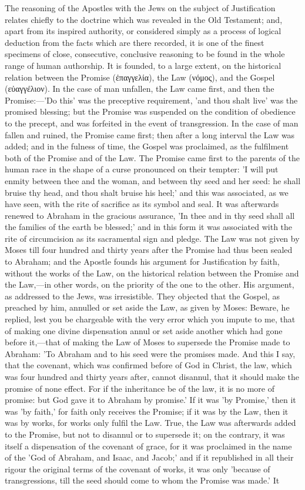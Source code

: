 \documentclass[
]{book}
\begin{document}
The reasoning of the Apostles with the Jews on the subject of Justification relates chiefly to the doctrine which was revealed in the Old Testament; and, apart from its inspired authority, or considered simply as a process of logical deduction from the facts which are there recorded, it is one of the finest specimens of close, consecutive, conclusive reasoning to be found in the whole range of human authorship. It is founded, to a large extent, on the historical relation between the Promise (ἐπαγγελία), the Law (νόμος), and the Gospel (εὐαγγέλιον). In the case of man unfallen, the Law came first, and then the Promise:---'Do this' was the preceptive requirement, 'and thou shalt live' was the promised blessing; but the Promise was suspended on the condition of obedience to the precept, and was forfeited in the event of transgression. In the case of man fallen and ruined, the Promise came first; then after a long interval the Law was added; and in the fulness of time, the Gospel was proclaimed, as the fulfilment both of the Promise and of the Law. The Promise came first to the parents of the human race in the shape of a curse pronounced on their tempter: 'I will put enmity between thee and the woman, and between thy seed and her seed: he shall bruise thy head, and thou shalt bruise his heel;' and this was associated, as we have seen, with the rite of sacrifice as its symbol and seal. It was afterwards renewed to Abraham in the gracious assurance, 'In thee and in thy seed shall all the families of the earth be blessed;' and in this form it was associated with the rite of circumcision as its sacramental sign and pledge. The Law was not given by Moses till four hundred and thirty years after the Promise had thus been sealed to Abraham; and the Apostle founds his argument for Justification by faith, without the works of the Law, on the historical relation between the Promise and the Law,---in other words, on the priority of the one to the other. His argument, as addressed to the Jews, was irresistible. They objected that the Gospel, as preached by him, annulled or set aside the Law, as given by Moses: Beware, he replied, lest you be chargeable with the very error which you impute to me, that of making one divine dispensation annul or set aside another which had gone before it,---that of making the Law of Moses to supersede the Promise made to Abraham: 'To Abraham and to his seed were the promises made. And this I say, that the covenant, which was confirmed before of God in Christ, the law, which was four hundred and thirty years after, cannot disannul, that it should make the promise of none effect. For if the inheritance be of the law, it is no more of promise: but God gave it to Abraham by promise.' If it was 'by Promise,' then it was 'by faith,' for faith only receives the Promise; if it was by the Law, then it was by works, for works only fulfil the Law. True, the Law was afterwards added to the Promise, but not to disannul or to supersede it; on the contrary, it was itself a dispensation of the covenant of grace, for it was proclaimed in the name of the 'God of Abraham, and Isaac, and Jacob;' and if it republished in all their rigour the original terms of the covenant of works, it was only 'because of transgressions, till the seed should come to whom the Promise was made.' It 
\end{document}
